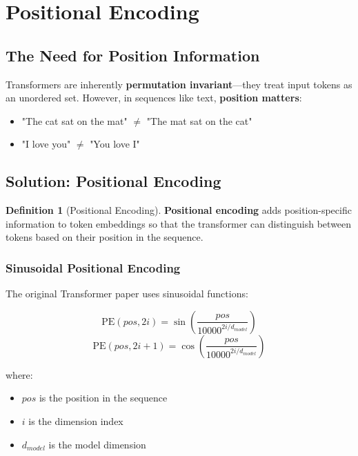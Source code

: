 \documentclass[11pt,a4paper]{article}
\theoremstyle{definition}
\newtheorem{definition}{Definition}[section]
\theoremstyle{plain}
\theoremstyle{remark}
\begin{document}
\section{Positional Encoding}

\subsection{The Need for Position Information}

\begin{tcolorbox}[colback=orange!10!white,colframe=orange!75!black,title=\textbf{Problem: Permutation Invariance}]
Transformers are inherently \textbf{permutation invariant}—they treat input tokens as an unordered set. However, in sequences like text, \textbf{position matters}:

\begin{itemize}
    \item "The cat sat on the mat" $\neq$ "The mat sat on the cat"
    \item "I love you" $\neq$ "You love I"
\end{itemize}
\end{tcolorbox}

\subsection{Solution: Positional Encoding}

\begin{definition}[Positional Encoding]
\textbf{Positional encoding} adds position-specific information to token embeddings so that the transformer can distinguish between tokens based on their position in the sequence.
\end{definition}

\subsubsection{Sinusoidal Positional Encoding}

The original Transformer paper uses sinusoidal functions:

\[
\text{PE}(pos, 2i) = \sin\left(\frac{pos}{10000^{2i/d_{model}}}\right)
\]
\[
\text{PE}(pos, 2i+1) = \cos\left(\frac{pos}{10000^{2i/d_{model}}}\right)
\]

where:
\begin{itemize}
    \item $pos$ is the position in the sequence
    \item $i$ is the dimension index
    \item $d_{model}$ is the model dimension
\end{itemize}
\end{document}

